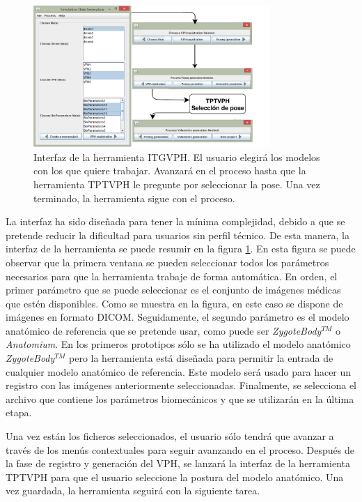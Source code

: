 \begin{figure}[h]
    \centering
    \includegraphics[width=0.8\textwidth]{IMG/toolkitui.png}
    \caption{Interfaz de la herramienta \acs{ITGVPH}. El usuario elegirá los modelos con los que quiere trabajar. Avanzará en el proceso hasta que la herramienta \acs{TPTVPH} le pregunte por seleccionar la pose. Una vez terminado, la herramienta sigue con el proceso.}
    \label{fig:toolui}
\end{figure}


La interfaz ha sido diseñada para tener la mínima complejidad, debido a que se pretende reducir la dificultad para usuarios sin perfil técnico. De esta manera, la interfaz de la herramienta se puede resumir en la figura \ref{fig:toolui}. En esta figura se puede observar que la primera ventana se pueden seleccionar todos los parámetros necesarios para que la herramienta trabaje de forma automática.
En orden, el primer parámetro que se puede seleccionar es el conjunto de imágenes médicas que estén disponibles. Como se muestra en la figura, en este caso se dispone de imágenes en formato \acs{DICOM}.
Seguidamente, el segundo parámetro es el modelo anatómico de referencia que se pretende usar, como puede ser \emph{ZygoteBody}$^{TM}$ o \emph{Anatomium}. En los primeros prototipos sólo se ha utilizado el modelo anatómico \emph{ZygoteBody}$^{TM}$ pero la herramienta está diseñada para permitir la entrada de cualquier modelo anatómico de referencia. Este modelo será usado para hacer un registro con las imágenes anteriormente seleccionadas. 
Finalmente, se selecciona el archivo que contiene los parámetros biomecánicos y que se utilizarán en la última etapa.



Una vez están los ficheros seleccionados, el usuario sólo tendrá que avanzar a través de los menús contextuales para seguir avanzando en el proceso. Después de la fase de registro y generación del \ac{VPH}, se lanzará la interfaz de la herramienta \ac{TPTVPH} para que el usuario seleccione la postura del modelo anatómico. Una vez guardada, la herramienta seguirá con la siguiente tarea.


